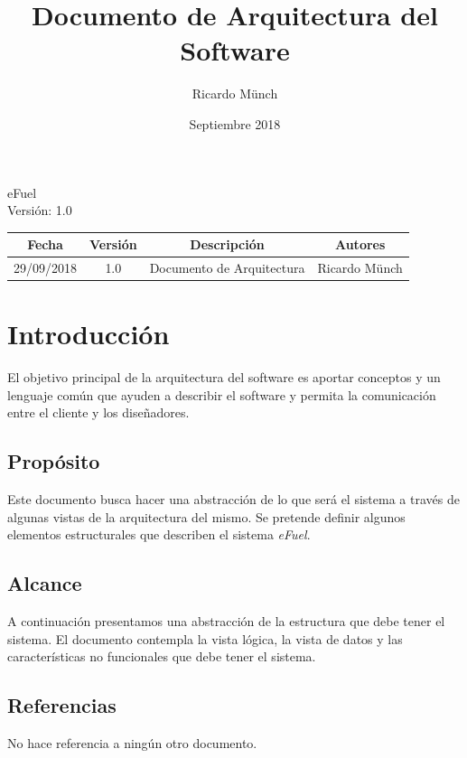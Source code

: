 \documentclass{article}
\title{Documento de Arquitectura del Software} \let\Title\@title
\date{Septiembre 2018} \let\Date\@date
\author{Ricardo Münch} \let\Author\@author
\begin{document}
    \begin{titlepage}
    \huge{\Title}
    \begin{flushright}
        \Large{eFuel \\ Versión: 1.0}
    \end{flushright}
    \end{titlepage}

    \newpage
    \tableofcontents

    \newpage
    \begin{center}
        \begin{tabular}{ |c|c|c|c| } 
            \hline
            \rowcolor{lightgray}
            Fecha & Versión & Descripción & Autores \\
            \hline 
            29/09/2018 & 1.0 & Documento de Arquitectura & Ricardo Münch \\
            \hline
        \end{tabular}
    \end{center}

    \newpage
    \section{Introducción}
    El objetivo principal de la arquitectura del software es aportar conceptos y un lenguaje común que ayuden a describir el software y permita la comunicación entre el cliente y los diseñadores.
    
    \subsection{Propósito}
    Este documento busca hacer una abstracción de lo que será el sistema a través de algunas vistas de la arquitectura del mismo. Se pretende definir algunos elementos estructurales que describen el sistema \emph{eFuel}.
    
    \subsection{Alcance}
    A continuación presentamos una abstracción de la estructura que debe tener el sistema. El documento contempla la vista lógica, la vista de datos y las características no funcionales que debe tener el sistema.
        
    \subsection{Referencias}
    No hace referencia a ningún otro documento.
    
\end{document}
